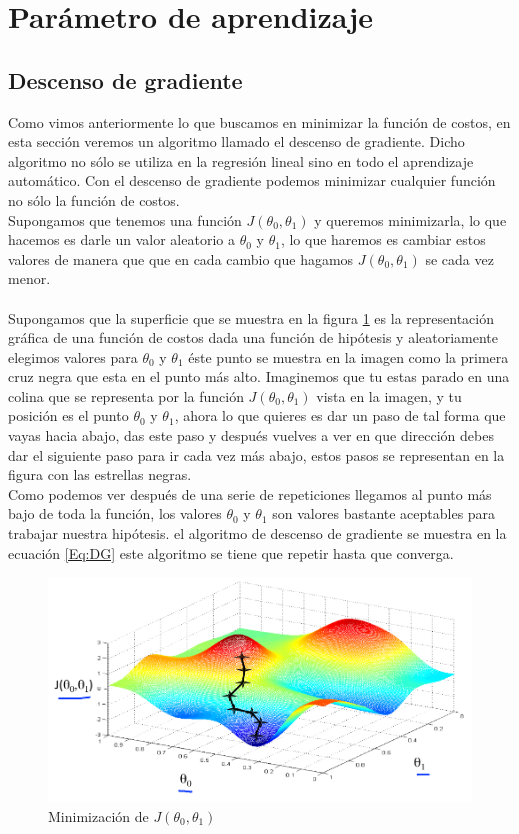 \documentclass{book}
\begin{document}
\section{Parámetro de aprendizaje}
\subsection{Descenso de gradiente}
Como vimos anteriormente lo que buscamos en minimizar la función de costos, en esta sección veremos un algoritmo llamado el descenso de gradiente. Dicho algoritmo no sólo se utiliza en la regresión lineal sino en todo el aprendizaje automático. Con el descenso de gradiente podemos minimizar cualquier función no sólo la función de costos.\\Supongamos que tenemos una función $J(\theta_0,\theta_1)$ y queremos minimizarla, lo que hacemos es darle un valor aleatorio a $\theta_0$ y $\theta_1$, lo que haremos es cambiar estos valores de manera que que en cada cambio que hagamos $J(\theta_0,\theta_1)$ se cada vez menor.\\\\Supongamos que la superficie que se muestra en la figura \ref{Fig:GD1} es la representación gráfica de una función de costos dada una función de hipótesis y aleatoriamente elegimos valores para $\theta_0$ y $\theta_1$ éste punto se muestra en la imagen como la primera cruz negra que esta en el punto más alto. Imaginemos que tu estas parado en una colina que se representa por la función $J(\theta_0,\theta_1)$ vista en la imagen, y tu posición es el punto $\theta_0$ y $\theta_1$, ahora lo que quieres es dar un paso de tal forma que vayas hacia abajo, das este paso y después vuelves a ver en que dirección debes dar el siguiente paso para ir cada vez más abajo, estos pasos se representan en la figura con las estrellas negras.\\ Como podemos ver después de una serie de repeticiones llegamos al punto más bajo de toda la función, los valores $\theta_0$ y $\theta_1$ son valores bastante aceptables para trabajar nuestra hipótesis. el algoritmo de descenso de gradiente se muestra en la ecuación \ref{Eq:DG} este algoritmo se tiene que repetir hasta que converga.
\begin{figure}[h]
	\centering
	\includegraphics[scale=0.5]{img/GD1}
	\caption{Minimización de $J(\theta_0,\theta_1)$}
	\label{Fig:GD1}	
\end{figure}
\end{document}
